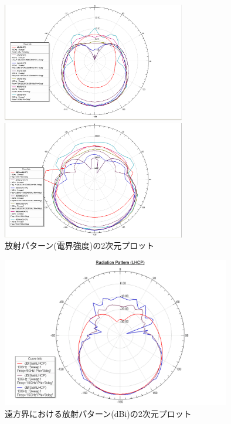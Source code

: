 \documentclass[11pt,a4paper,uplatex,draft]{ujarticle}
\begin{document}
  \clearpage
  \begin{figure}[tbp]
    \centering
    \begin{minipage}[b]{0.5\textwidth}
      \centering
      \includegraphics[keepaspectratio, width=80mm]{Images/rad_pattern_far.png}
    \end{minipage}
    \begin{minipage}[b]{0.5\textwidth}
      \centering
      \includegraphics[keepaspectratio, width=80mm]{Images/rad_pattern_near.png}
    \end{minipage}
    \caption{放射パターン(電界強度)の2次元プロット}\label{fig:radiation_pattern_2D}
  \end{figure}
  \begin{figure}[hbtp]
    \centering
    \includegraphics[keepaspectratio, width=100mm]{Images/radiation_pattern_lhcp.png}
    \caption{遠方界における放射パターン(dBi)の2次元プロット}
    \label{fig:radiation_pattern_lhcp}
  \end{figure}
  \clearpage
\end{document}

